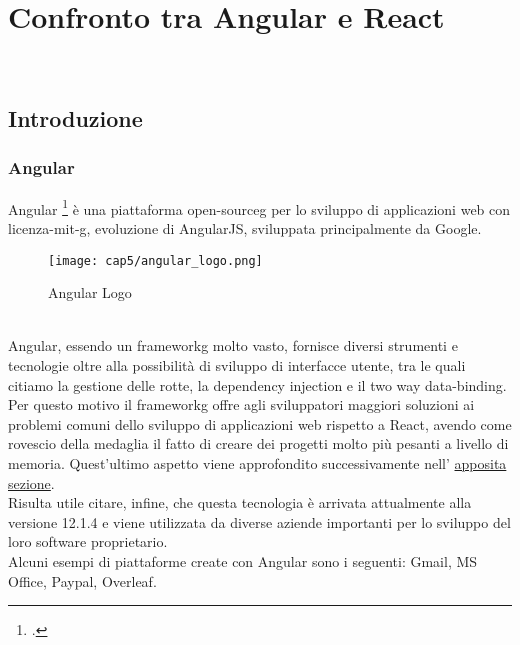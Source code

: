 
\chapter{Confronto tra Angular e React}
\label{cap:angular-react}
\\

\section{Introduzione}

\subsection{Angular}
Angular \footcite{site:angular} è una piattaforma \gls{open-sourceg} per lo sviluppo di applicazioni web con \gls{licenza-mit-g}, evoluzione di AngularJS, sviluppata principalmente da Google. \\
\begin{figure}[!h] 
    \centering 
    \texttt{[image: cap5/angular\_logo.png]} 
    \caption{Angular Logo}
\end{figure} \\
Angular, essendo un \gls{frameworkg} molto vasto, fornisce diversi strumenti e tecnologie oltre alla possibilità di sviluppo di interfacce utente, tra le quali citiamo la gestione delle rotte, la dependency injection e il two way data-binding. Per questo motivo il \gls{frameworkg} offre agli sviluppatori maggiori soluzioni ai problemi comuni dello sviluppo di applicazioni web rispetto a React, avendo come rovescio della medaglia il fatto di creare dei progetti molto più pesanti a livello di memoria. Quest'ultimo aspetto viene approfondito successivamente nell' \hyperref[sec:performance]{apposita sezione}. \\
Risulta utile citare, infine, che questa tecnologia è arrivata attualmente alla versione 12.1.4 e viene utilizzata da diverse aziende importanti per lo sviluppo del loro software proprietario.  \\
Alcuni esempi di piattaforme create con Angular sono i seguenti: Gmail, MS Office, Paypal, Overleaf.

